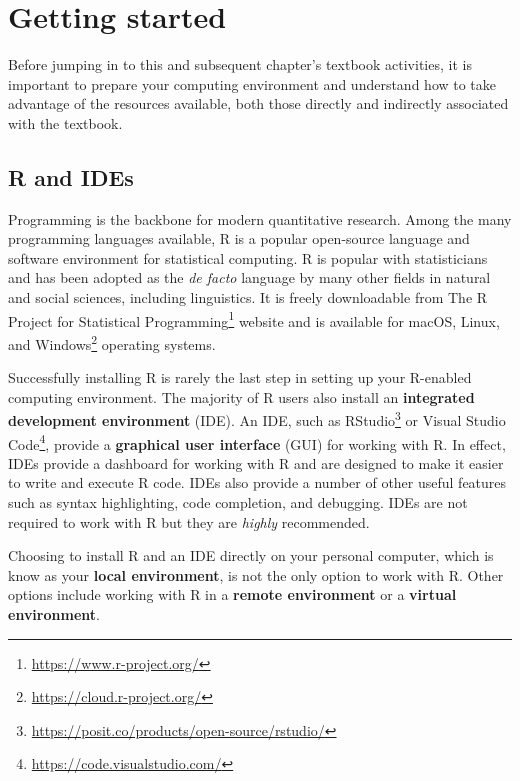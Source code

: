 \documentclass[
  letterpaper,
  DIV=11,
  numbers=noendperiod]{scrreprt}
\theoremstyle{definition}
\theoremstyle{remark}
\DeclareRobustCommand{\href}[2]{#2\footnote{\url{#1}}}
\begin{document}
\section*{Getting started}\label{sec-p-getting-started}


Before jumping in to this and subsequent chapter's textbook activities,
it is important to prepare your computing environment and understand how
to take advantage of the resources available, both those directly and
indirectly associated with the textbook.

\subsection*{R and IDEs}\label{sec-p-r-ides}

Programming is the backbone for modern quantitative research. Among the
many programming languages available, R is a popular open-source
language and software environment for statistical computing. R is
popular with statisticians and has been adopted as the \emph{de facto}
language by many other fields in natural and social sciences, including
linguistics. It is freely downloadable from
\href{https://www.r-project.org/}{The R Project for Statistical
Programming} website and is available for
\href{https://cloud.r-project.org/}{macOS, Linux, and Windows} operating
systems.

Successfully installing R is rarely the last step in setting up your
R-enabled computing environment. The majority of R users also install an
\textbf{integrated development environment} (IDE). An IDE, such as
\href{https://posit.co/products/open-source/rstudio/}{RStudio} or
\href{https://code.visualstudio.com/}{Visual Studio Code}, provide a
\textbf{graphical user interface} (GUI) for working with R. In effect,
IDEs provide a dashboard for working with R and are designed to make it
easier to write and execute R code. IDEs also provide a number of other
useful features such as syntax highlighting, code completion, and
debugging. IDEs are not required to work with R but they are
\emph{highly} recommended.

Choosing to install R and an IDE directly on your personal computer,
which is know as your \textbf{local environment}, is not the only option
to work with R. Other options include working with R in a \textbf{remote
environment} or a \textbf{virtual environment}.
\end{document}
